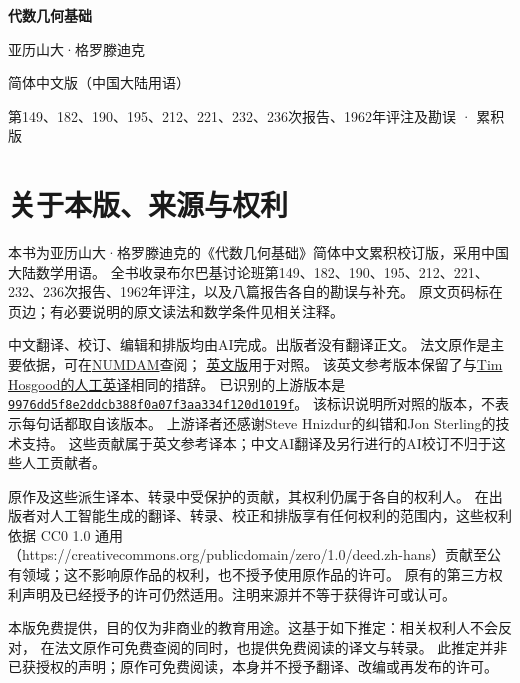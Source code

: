 \documentclass[12pt,twoside,openany]{book}
\numberwithin{equation}{section}
\theoremstyle{plain}
\theoremstyle{definition}
\theoremstyle{remark}
\begin{document}
\frontmatter
\begin{titlepage}
  \centering
  \vspace*{0.16\textheight}
  {\Huge\bfseries 代数几何基础\par}
  \vspace{1.2\baselineskip}
  {\Large 亚历山大·格罗滕迪克\par}
  \vfill
  {\large 简体中文版（中国大陆用语）\par}
  \vspace{0.5\baselineskip}
  {\normalsize 第149、182、190、195、212、221、232、236次报告、1962年评注及勘误 · 累积版\par}
\end{titlepage}
\chapter*{关于本版、来源与权利}
本书为亚历山大·格罗滕迪克的《代数几何基础》简体中文累积校订版，采用中国大陆数学用语。
全书收录布尔巴基讨论班第149、182、190、195、212、221、232、236次报告、1962年评注，以及八篇报告各自的勘误与补充。
原文页码标在页边；有必要说明的原文读法和数学条件见相关注释。

中文翻译、校订、编辑和排版均由AI完成。出版者没有翻译正文。
法文原作是主要依据，可在\href{https://www.numdam.org/}{NUMDAM}查阅；
\href{https://github.com/KokunoYumeto/fga-en}{英文版}用于对照。
该英文参考版本保留了与\href{https://github.com/thosgood/fga}{Tim Hosgood的人工英译}相同的措辞。
已识别的上游版本是
\href{https://github.com/thosgood/fga/tree/9976dd5f8e2ddcb388f0a07f3aa334f120d1019f}{\nolinkurl{9976dd5f8e2ddcb388f0a07f3aa334f120d1019f}}。
该标识说明所对照的版本，不表示每句话都取自该版本。
上游译者还感谢Steve Hnizdur的纠错和Jon Sterling的技术支持。
这些贡献属于英文参考译本；中文AI翻译及另行进行的AI校订不归于这些人工贡献者。

原作及这些派生译本、转录中受保护的贡献，其权利仍属于各自的权利人。
在出版者对人工智能生成的翻译、转录、校正和排版享有任何权利的范围内，这些权利依据 CC0 1.0 通用（https://creativecommons.org/publicdomain/zero/1.0/deed.zh-hans）贡献至公有领域；这不影响原作品的权利，也不授予使用原作品的许可。
原有的第三方权利声明及已经授予的许可仍然适用。注明来源并不等于获得许可或认可。

本版免费提供，目的仅为非商业的教育用途。这基于如下推定：相关权利人不会反对，
在法文原作可免费查阅的同时，也提供免费阅读的译文与转录。
此推定并非已获授权的声明；原作可免费阅读，本身并不授予翻译、改编或再发布的许可。
\end{document}
